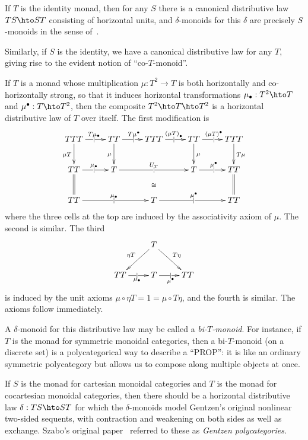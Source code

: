 \documentclass{amsart}
\newcommand{\repr}[1]{{#1}_\bullet}
\newcommand{\corepr}[1]{{#1}^\bullet}
\begin{document}
\begin{eg}
  If $T$ is the identity monad, then for any $S$ there is a canonical distributive law $TS \hto ST$ consisting of horizontal units, and $\delta$-monoids for this $\delta$ are precisely $S$-monoids in the sense of~\cite{cs:multicats}.
\end{eg}

\begin{eg}
  Similarly, if $S$ is the identity, we have a canonical distributive law for any $T$, giving rise to the evident notion of ``co-$T$-monoid''.
\end{eg}

\begin{eg}
  If $T$ is a monad whose multiplication $\mu:T^2\to T$ is both horizontally and co-horizontally strong, so that it induces horizontal transformations $\repr\mu : T^2\hto T$ and $\corepr\mu : T\hto T^2$, then the composite $T^2\hto T\hto T^2$ is a horizontal distributive law of $T$ over itself.
  The first modification is
  \[ \xymatrix{
    TTT \ar[r]|{|}^{T\repr \mu} \ar[d]_{\mu T} & 
    TT \ar[r]|{|}^{T\corepr \mu} \ar[d]_{\mu} &
    TTT \ar[r]|{|}^{\repr{(\mu T)}}  & 
    TT \ar[r]|{|}^{\corepr{(\mu T)}} \ar[d]^{\mu} &
    TTT \ar[d]^{T\mu} \\
    TT \ar[r]|{|}^{\repr \mu} \ar@{=}[d] &
    T \ar[rr]|{|}^{U_T} & \ar@{}[d]|{\cong} &
    T \ar[r]|{|}^{\corepr\mu} &
    TT \ar@{=}[d]\\
    TT \ar[rr]|{|}^{\repr \mu} &&
    T \ar[rr]|{|}^{\corepr \mu} &&
    TT
  } \]
  where the three cells at the top are induced by the associativity axiom of $\mu$.
  The second is similar.
  The third
  \[ \xymatrix{ & T \ar[dl]_{\eta T} \ar[dr]^{T\eta} \\
    TT \ar[r]|{|}_{\repr \mu} &
    T \ar[r]|{|}_{\corepr \mu} &
    TT } \]
  is induced by the unit axioms $\mu \circ \eta T = 1 = \mu\circ T \eta$, and the fourth is similar.
  The axioms follow immediately.

  A $\delta$-monoid for this distributive law may be called a \emph{bi-$T$-monoid}.
  For instance, if $T$ is the monad for symmetric monoidal categories, then a bi-$T$-monoid (on a discrete set) is a polycategorical way to describe a ``PROP'': it is like an ordinary symmetric polycategory but allows us to compose along multiple objects at once.
\end{eg}

\begin{eg}
  If $S$ is the monad for cartesian monoidal categories and $T$ is the monad for cocartesian monoidal categories, then there should be a horizontal distributive law $\delta:TS\hto ST$ for which the $\delta$-monoids model Gentzen's original nonlinear two-sided sequents, with contraction and weakening on both sides as well as exchange.
  Szabo's original paper~\cite{szabo:polycats} referred to these as \emph{Gentzen polycategories}.
\end{eg}
\end{document}
